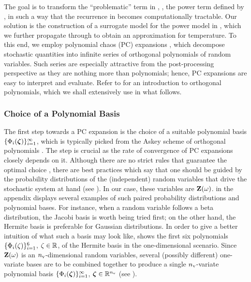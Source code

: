 The goal is to transform the ``problematic'' term in , \ie, the power term defined by , in such a way that the recurrence in  becomes computationally tractable.
Our solution is the construction of a surrogate model for the power model in , which we further propagate through  to obtain an approximation for temperature.
To this end, we employ polynomial chaos (PC) expansions \cite{xiu2010}, which decompose stochastic quantities into infinite series of orthogonal polynomials of random variables.
Such series are especially attractive from the post-processing perspective as they are nothing more than polynomials; hence, PC expansions are easy to interpret and evaluate.
Refer to  for an introduction to orthogonal polynomials, which we shall extensively use in what follows.


\subsubsection{Choice of a Polynomial Basis}
The first step towards a PC expansion is the choice of a suitable polynomial basis $\{ \Phi_i(\boldsymbol{\zeta}) \}_{i = 1}^\infty$, which is typically picked from the Askey scheme of orthogonal polynomials \cite{xiu2010}.
The step is crucial as the rate of convergence of PC expansions closely depends on it.
Although there are no strict rules that guarantee the optimal choice \cite{maitre2010, knio2006}, there are best practices which say that one should be guided by the probability distributions of the (independent) random variables that drive the stochastic system at hand (see ).
In our case, these variables are $\mathbf{Z}(\omega)$.
 in the appendix displays several examples of such paired probability distributions and polynomial bases.
For instance, when a random variable follows a beta distribution, the Jacobi basis is worth being tried first; on the other hand, the Hermite basis is preferable for Gaussian distributions.
In order to give a better intuition of what such a basis may look like,  shows the first six polynomials $\{ \Phi_i(\zeta) \}_{i = 1}^6$, $\zeta \in \mathbb{R}$, of the Hermite basis in the one-dimensional scenario.
Since $\mathbf{Z}(\omega)$ is an ${n_\text{v}}$-dimensional random variables, several (possibly different) one-variate bases are to be combined together to produce a single ${n_\text{v}}$-variate polynomial basis $\{ \Phi_i(\boldsymbol{\zeta}) \}_{i = 1}^\infty$, $\boldsymbol{\zeta} \in \mathbb{R}^{n_\text{v}}$ (see \cite{xiu2010, maitre2010}).

